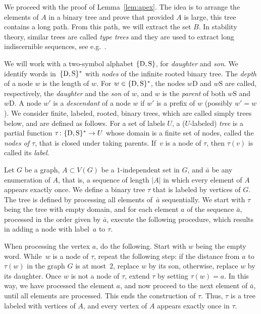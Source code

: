 We proceed with the proof of Lemma~\ref{lem:apex}.  The idea is to
arrange the elements of $A$ in a binary tree and prove that provided
$A$ is large, this tree contains a long path. From this path, we will
extract the set $B$.  In stability theory, similar trees are called
\emph{type trees} and they are used to extract long indiscernible
sequences, see e.g.~\cite{malliaris2014regularity}.


\newcommand{\dau}{\mathrm{D}}
\newcommand{\son}{\mathrm{S}}
	
We will work with a two-symbol alphabet $\set{\dau,\son}$, for
{\em{daughter}} and {\em{son}}.  We identify words
in~$\set{\dau,\son}^*$ with \emph{nodes} of the infinite rooted binary
tree.  The \emph{depth} of a node $w$ is the length of $w$.  For
$w\in \set{\dau,\son}^*$, the nodes $w\dau$ and $w\son$ are called,
respectively, the \emph{daughter} and the \emph{son} of $w$, and $w$
is the \emph{parent} of both $w\son$ and $w\dau$. A node $w'$ is a
{\em{descendant}} of a node $w$ if $w'$ is a prefix of $w$ (possibly
$w'=w$).  We consider finite, labeled, rooted, binary trees, which are
called simply trees below, and are defined as follows.  For a set of
labels $U$, a ($U$-labeled) \emph{tree} is a partial function
$\tau\from \set{\dau,\son}^*\to U$ whose domain is a finite set of
nodes, called the \emph{nodes of $\tau$}, that is closed under taking
parents.  If~$v$ is a node of $\tau$, then $\tau(v)$ is called its
\emph{label}.
  
Let $G$ be a graph, $A\subset V(G)$ be a $1$-independent set in $G$,
and $\bar a$ be any enumeration of $A$, that is, a sequence of length
$|A|$ in which every element of $A$ appears exactly once.  We define a
binary tree $\tau$ that is labeled by vertices of $G$. The tree is
defined by processing all elements of~$\bar a$ sequentially.  We start
with $\tau$ being the tree with empty domain, and for each element $a$
of the sequence $\bar a$, processed in the order given by $\bar a$,
execute the following procedure, which results in adding a node with
label~$a$ to $\tau$.
  
When processing the vertex $a$, do the following. Start with $w$ being
the empty word. While~$w$ is a node of $\tau$, repeat the following
step: if the distance from $a$ to $\tau(w)$ in the graph $G$ is at
most~$2$, replace $w$ by its son, otherwise, replace $w$ by its
daughter.
Once $w$ is not a node of $\tau$, extend $\tau$ by setting
$\tau(w)=a$. In this way, we have processed the element $a$, and now
proceed to the next element of $\bar a$, until all elements are
processed. This ends the construction of $\tau$.  Thus, $\tau$ is a
tree labeled with vertices of $A$, and every vertex of $A$ appears
exactly once in $\tau$.
	

